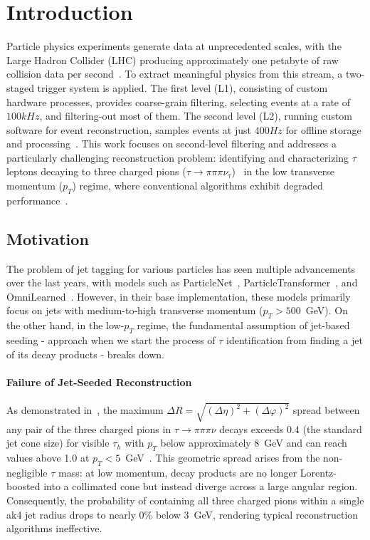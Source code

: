 \chapter{Introduction}

Particle physics experiments generate data at unprecedented scales, with the Large Hadron Collider (LHC) producing approximately one petabyte of raw collision data per second~\cite{cern_computing}. To extract meaningful physics from this stream, a two-staged trigger system is applied. The first level (L1), consisting of custom hardware processes, provides coarse-grain filtering, selecting events at a rate of $100kHz$, and filtering-out most of them. The second level (L2), running custom software for event reconstruction, samples events at just $400Hz$ for offline storage and processing~\cite{cms_trigger_2017,cms_hlt_run2}. This work focuses on second-level filtering and addresses a particularly challenging reconstruction problem: identifying and characterizing $\tau$ leptons decaying to three charged pions ($\tau \to \pi\pi\pi \nu_\tau$)~\cite{pdg_tau_branching} in the low transverse momentum ($p_T$) regime, where conventional algorithms exhibit degraded performance~\cite{cms_tau_performance_2018,cms_deeptau_v25,abcnet-low-pt}.

\section{Motivation}

The problem of jet tagging for various particles has seen multiple advancements over the last years, with models such as ParticleNet~\cite{particlenet}, ParticleTransformer~\cite{particle_transformer_2022}, and OmniLearned~\cite{omnilearned}. However, in their base implementation, these models primarily focus on jets with medium-to-high transverse momentum ($p_T > 500$~GeV). On the other hand, in the low-$p_T$ regime, the fundamental assumption of jet-based seeding - approach when we start the process of $\tau$ identification from finding a jet of its decay products - breaks down.

\subsubsection{Failure of Jet-Seeded Reconstruction}

As demonstrated in~\cite{abcnet-low-pt}, the maximum $\Delta R = \sqrt{\left(\Delta\eta\right)^2 + \left(\Delta\varphi\right)^2}$ spread between any pair of the three charged pions in $\tau \to \pi\pi\pi\nu$ decays exceeds 0.4 (the standard jet cone size) for visible $\tau_h$ with $p_T$ below approximately 8~GeV and can reach values above 1.0 at $p_T < 5$~GeV~\cite{atlas_low_pt_tracking_2016}. This geometric spread arises from the non-negligible $\tau$ mass: at low momentum, decay products are no longer Lorentz-boosted into a collimated cone but instead diverge across a large angular region. Consequently, the probability of containing all three charged pions within a single ak4 jet radius drops to nearly 0\% below 3~GeV, rendering typical reconstruction algorithms ineffective.

